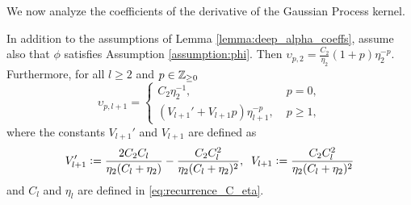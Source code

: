 We now analyze the coefficients of the derivative of the Gaussian Process kernel.

\begin{lemma} \label{lemma:deep_upsilon_coeffs}
    In addition to the assumptions of Lemma \ref{lemma:deep_alpha_coeffs}, assume also that $\phi$ satisfies Assumption \ref{assumption:phi}. Then $\upsilon_{p,2} = \frac{C_2}{\eta_2}(1+ p) \eta_2^{-p}$. Furthermore, for all $l\geq 2$ and $p \in \mathbb{Z}_{\geq 0}$  \begin{equation}\label{eq:deep_upsilon_hypothesis}
    \upsilon_{p,l+1} = 
         \begin{cases}
            C_2 \eta_2^{-1}, & \; p=0,\\
            (V_{l+1}' + V_{l+1}p)\eta_{l+1}^{-p}, & \;p \geq 1,
        \end{cases}
    \end{equation}
    where the constants $V_{l+1}'$ and $V_{l+1}$ are defined as
    \begin{equation}
    \begin{aligned} \label{eq:K_upsilon}
        V_{l+1}' \vcentcolon= \frac{2C_2 C_l}{\eta_2(C_l + \eta_2)} - \frac{C_2C_l^2}{\eta_2( C_l + \eta_2)^2}, \;\; V_{l+1} \vcentcolon= \frac{C_2C_l^2}{\eta_2( C_l + \eta_2)^2}    
    \end{aligned}
    \end{equation}
    and $C_l$ and $\eta_l$ are defined in \eqref{eq:recurrence_C_eta}.
\end{lemma}
